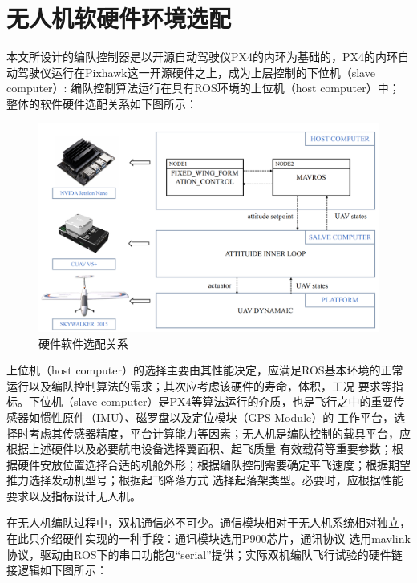 \section{无人机软硬件环境选配}
本文所设计的编队控制器是以开源自动驾驶仪PX4的内环为基础的，PX4的内环自动驾驶仪运行在Pixhawk这一开源硬件之上，成为上层控制的下位机（slave computer）:
编队控制算法运行在具有ROS环境的上位机（host computer）中；
整体的软件硬件选配关系如下图所示：
\begin{figure}[H]
    \centering
    \includegraphics[width=1\textwidth]{figures/c4/c4-soft-hard.png}
    \caption{硬件软件选配关系}\label{fig:c4-soft-hard.png}
\end{figure}
上位机（host computer）的选择主要由其性能决定，应满足ROS基本环境的正常运行以及编队控制算法的需求；其次应考虑该硬件的寿命，体积，工况
要求等指标。下位机（slave computer）是PX4等算法运行的介质，也是飞行之中的重要传感器如惯性原件（IMU）、磁罗盘以及定位模块（GPS Module）的
工作平台，选择时考虑其传感器精度，平台计算能力等因素；无人机是编队控制的载具平台，应根据上述硬件以及必要航电设备选择翼面积、起飞质量
有效载荷等重要参数；根据硬件安放位置选择合适的机舱外形；根据编队控制需要确定平飞速度；根据期望推力选择发动机型号；根据起飞降落方式
选择起落架类型。必要时，应根据性能要求以及指标设计无人机。

在无人机编队过程中，双机通信必不可少。通信模块相对于无人机系统相对独立，在此只介绍硬件实现的一种手段：通讯模块选用P900芯片，通讯协议
选用mavlink协议，驱动由ROS下的串口功能包“serial”提供；实际双机编队飞行试验的硬件链接逻辑如下图所示：


